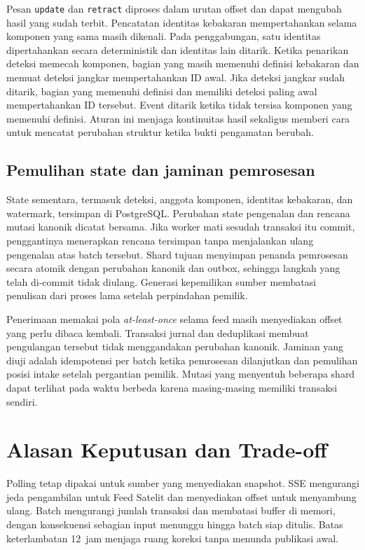 Pesan \texttt{update} dan \texttt{retract} diproses dalam urutan offset dan dapat mengubah hasil yang sudah terbit. Pencatatan identitas kebakaran mempertahankan  selama komponen yang sama masih dikenali. Pada penggabungan, satu identitas dipertahankan secara deterministik dan identitas lain ditarik. Ketika penarikan deteksi memecah komponen, bagian yang masih memenuhi definisi kebakaran dan memuat deteksi jangkar mempertahankan ID awal. Jika deteksi jangkar sudah ditarik, bagian yang memenuhi definisi dan memiliki deteksi paling awal mempertahankan ID tersebut. Event ditarik ketika tidak tersisa komponen yang memenuhi definisi. Aturan ini menjaga kontinuitas hasil sekaligus memberi cara untuk mencatat perubahan struktur ketika bukti pengamatan berubah.

\subsection{Pemulihan state dan jaminan pemrosesan}

State sementara, termasuk deteksi, anggota komponen, identitas kebakaran, dan watermark, tersimpan di PostgreSQL. Perubahan state pengenalan dan rencana mutasi kanonik dicatat bersama. Jika worker mati sesudah transaksi itu commit, penggantinya menerapkan rencana tersimpan tanpa menjalankan ulang pengenalan atas batch tersebut. Shard tujuan menyimpan penanda pemrosesan secara atomik dengan perubahan kanonik dan outbox, sehingga langkah yang telah di-commit tidak diulang. Generasi kepemilikan sumber membatasi penulisan dari proses lama setelah perpindahan pemilik.

Penerimaan memakai pola \emph{at-least-once} selama feed masih menyediakan offset yang perlu dibaca kembali. Transaksi jurnal dan deduplikasi membuat pengulangan tersebut tidak menggandakan perubahan kanonik. Jaminan yang diuji adalah idempotensi per batch ketika pemrosesan dilanjutkan dan pemulihan posisi intake setelah pergantian pemilik. Mutasi yang menyentuh beberapa shard dapat terlihat pada waktu berbeda karena masing-masing memiliki transaksi sendiri.

\section{Alasan Keputusan dan Trade-off}

Polling tetap dipakai untuk sumber yang menyediakan snapshot. SSE mengurangi jeda pengambilan untuk Feed Satelit dan menyediakan offset untuk menyambung ulang. Batch mengurangi jumlah transaksi dan membatasi buffer di memori, dengan konsekuensi sebagian input menunggu hingga batch siap ditulis. Batas keterlambatan 12~jam menjaga ruang koreksi tanpa menunda publikasi awal.

